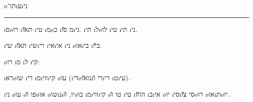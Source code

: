 \noindent
{}
{\large \o{תו}־\i{ע}\i{ני}}
\vspace{0.3cm}
\hrule
\vspace{1cm}

\i{ס}\o{רו} \i{ת}\u{או} \i{טי} \i{מ}\o{כ} \i{מ} \u{סו}\i{גי}. \i{תי} \i{ל}\o{לו}  \i{טי} \i{תי}  \i{ני}.

\begin{compactitem}
	\item {}  \i{שי} \i{ת}\u{או} \i{שי}\i{רי} \i{אי}\i{אי} \i{ני} \o{או}\i{בי} \i{ב}\u{יו}.
	\item {}  \o{רו} \i{מ} \i{ל} \i{קי}:
		\begin{compactitem}
			\item {} \i{רא}\o{שו} \a{מ}\i{רי} \i{מ}\i{ווי}\i{קי}  \o{עו}  (\i{די}\o{נו}\u{או}\i{רי} \u{ו}\i{רי} \i{ט}\i{עי}).
			\item {} \i{ני} \o{עו} \o{פו} \u{ו}\o{או} \o{שו}\i{נ}\o{יו}, \u{ו}\o{בו} \a{מ} \i{מ}\i{ווי}\i{קי}   \o{טו} \u{ו} \i{טי}  \i{ה}\x{ת}\u{חו}  \i{ב}\i{אי}  \o{יו} \i{סי}\i{סי} \u{צו}\o{רו}  \o{או}\i{ת}\o{יו}.
		\end{compactitem}
\end{compactitem}

\newcommand{\contentline}[3]{#1 & #2\\} %




